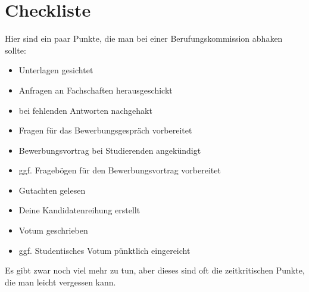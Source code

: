 \chapter{Checkliste}\thispagestyle{fancy}\label{chp:checkliste}
Hier sind ein paar Punkte, die man bei einer Berufungskommission abhaken sollte:
\begin{itemize}
    \item [\Square] Unterlagen gesichtet
    \item [\Square] Anfragen an Fachschaften herausgeschickt
    \item [\Square] bei fehlenden Antworten nachgehakt
    \item [\Square] Fragen für das Bewerbungsgespräch vorbereitet
    \item [\Square] Bewerbungsvortrag bei Studierenden angekündigt
    \item [\Square] ggf. Fragebögen für den Bewerbungsvortrag vorbereitet
    \item [\Square] Gutachten gelesen
    \item [\Square] Deine Kandidatenreihung erstellt
    \item [\Square] Votum geschrieben
    \item [\Square] ggf. Studentisches Votum pünktlich eingereicht
\end{itemize}
Es gibt zwar noch viel mehr zu tun, aber dieses sind oft die zeitkritischen Punkte, die man leicht vergessen kann.

